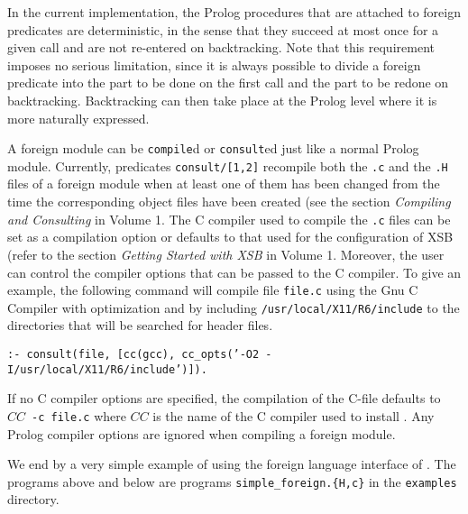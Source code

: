 In the current implementation, the Prolog procedures that are
attached to foreign predicates are deterministic, in the sense that
they succeed at most once for a given call and are not re-entered on
backtracking.  Note that this requirement imposes no serious
limitation, since it is always possible to divide a foreign predicate
into the part to be done on the first call and the part to be redone
on backtracking.  Backtracking can then take place at the Prolog
level where it is more naturally expressed.

A foreign module can be {\tt compile}d or {\tt consult}ed just like a
normal Prolog module.  Currently, predicates {\tt consult/[1,2]}
recompile both the {\tt *.c} and the {\tt *.H} files of a foreign
module when at least one of them has been changed from the time the
corresponding object files have been created (see the section {\it
Compiling and Consulting} in Volume 1. 
The C compiler used to compile the {\tt *.c} files can be set as a
compilation option or defaults to that used for the configuration of
XSB (refer to the section {\it Getting Started with XSB} in Volume 1.
Moreover, the user can control the compiler options that can be passed
to the C compiler.  To give an example, the following command will
compile file {\tt file.c} using the Gnu C Compiler with optimization
and by including {\tt /usr/local/X11/R6/include} to the directories that
will be searched for header files.
\begin{center}
{\tt  :- consult(file,
		 [cc(gcc), cc\_opts('-O2 -I/usr/local/X11/R6/include')]). }
\end{center}
If no C compiler options are specified, the compilation of the C-file
defaults to $CC$~{\tt -c~file.c} where $CC$ is the name of the C compiler
used to install \ourprolog.
Any Prolog compiler options are ignored when compiling a foreign module.

We end by a very simple example of using the foreign language
interface of \ourprolog.  The programs above and below are programs
{\tt simple\_foreign.\{H,c\}} in the {\tt examples} directory.

